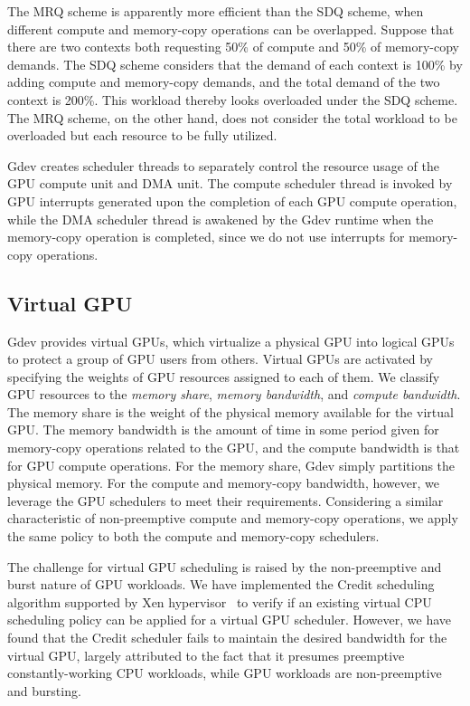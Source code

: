 The MRQ scheme is apparently more efficient than the SDQ scheme, when
different compute and memory-copy operations can be overlapped.
Suppose that there are two contexts both requesting 50\% of compute
and 50\% of memory-copy demands.
The SDQ scheme considers that the demand of each context is 100\% by
adding compute and memory-copy demands, and the total demand of the
two context is 200\%.
This workload thereby looks overloaded under the SDQ scheme.
The MRQ scheme, on the other hand, does not consider the total workload
to be overloaded but each resource to be fully utilized.

Gdev creates scheduler threads to separately control the resource
usage of the GPU compute unit and DMA unit.
The compute scheduler thread is invoked by GPU interrupts generated upon
the completion of each GPU compute operation, while the DMA scheduler
thread is awakened by the Gdev runtime when the memory-copy operation is
completed, since we do not use interrupts for memory-copy operations.

\subsection{Virtual GPU}
\label{sec:virtual_gpu}
\vspace{-0.25em}

Gdev provides virtual GPUs, which virtualize a physical GPU into logical
GPUs to protect a group of GPU users from others.
Virtual GPUs are activated by specifying the weights of GPU resources
assigned to each of them.
We classify GPU resources to the \textit{memory share}, \textit{memory
bandwidth}, and \textit{compute bandwidth}.
The memory share is the weight of the physical memory available for the
virtual GPU.
The memory bandwidth is the amount of time in some period given for
memory-copy operations related to the GPU, and the compute bandwidth is
that for GPU compute operations.
For the memory share, Gdev simply partitions the physical memory.
For the compute and memory-copy bandwidth, however, we leverage the GPU 
schedulers to meet their requirements.
Considering a similar characteristic of non-preemptive compute and
memory-copy operations, we apply the same policy to both the compute and
memory-copy schedulers.

The challenge for virtual GPU scheduling is raised by the non-preemptive
and burst nature of GPU workloads.
We have implemented the Credit scheduling algorithm supported by Xen
hypervisor~\cite{Barham_SOSP03} to verify if an existing virtual CPU
scheduling policy can be applied for a virtual GPU scheduler.
However, we have found that the Credit scheduler fails to maintain the
desired bandwidth for the virtual GPU, largely attributed to the fact
that it presumes preemptive constantly-working CPU workloads, while GPU
workloads are non-preemptive and bursting.

